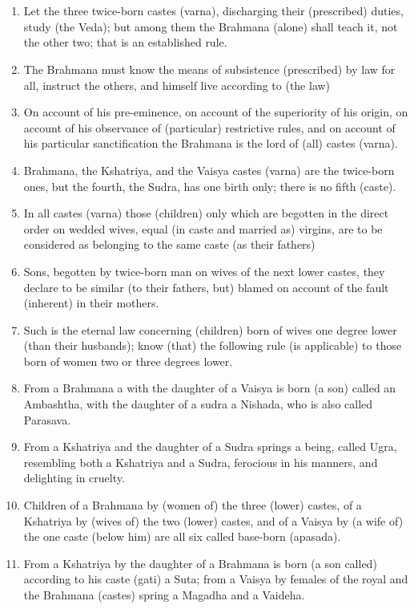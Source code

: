 \chapter{}
\begin{enumerate}
\item Let the three twice-born castes (varna), discharging their (prescribed) duties, study (the Veda); but among them the Brahmana (alone) shall teach it, not the other two; that is an established rule.
\item The Brahmana must know the means of subsistence (prescribed) by law for all, instruct the others, and himself live according to (the law)
\item On account of his pre-eminence, on account of the superiority of his origin, on account of his observance of (particular) restrictive rules, and on account of his particular sanctification the Brahmana is the lord of (all) castes (varna).
\item Brahmana, the Kshatriya, and the Vaisya castes (varna) are the twice-born ones, but the fourth, the Sudra, has one birth only; there is no fifth (caste).
\item In all castes (varna) those (children) only which are begotten in the direct order on wedded wives, equal (in caste and married as) virgins, are to be considered as belonging to the same caste (as their fathers)
\item Sons, begotten by twice-born man on wives of the next lower castes, they declare to be similar (to their fathers, but) blamed on account of the fault (inherent) in their mothers.
\item Such is the eternal law concerning (children) born of wives one degree lower (than their husbands); know (that) the following rule (is applicable) to those born of women two or three degrees lower.
\item From a Brahmana a with the daughter of a Vaisya is born (a son) called an Ambashtha, with the daughter of a sudra a Nishada, who is also called Parasava.
\item From a Kshatriya and the daughter of a Sudra springs a being, called Ugra, resembling both a Kshatriya and a Sudra, ferocious in his manners, and delighting in cruelty.
\item Children of a Brahmana by (women of) the three (lower) castes, of a Kshatriya by (wives of) the two (lower) castes, and of a Vaisya by (a wife of) the one caste (below him) are all six called base-born (apasada).
\item From a Kshatriya by the daughter of a Brahmana is born (a son called) according to his caste (gati) a Suta; from a Vaisya by females of the royal and the Brahmana (castes) spring a Magadha and a Vaideha.

\end{enumerate}
